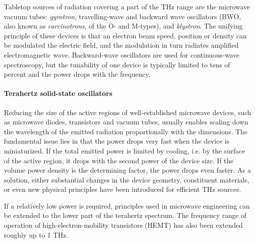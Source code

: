 Tabletop sources of radiation covering a part of the THz range are the microwave vacuum tubes: \textit{gyrotron}, travelling-wave and backward wave oscillators (BWO, also known as \textit{carcinotrons}, of the O- and M-types), and \textit{klystron}. The unifying principle of these devices is that an electron beam speed, position or density can be modulated the electric field, and the modulation in turn radiates amplified electromagnetic wave. Backward-wave oscillators are %
 used for continuous-wave spectroscopy, but the tunability of one device is typically limited to tens of percent and the power drops with the frequency.

\paragraph{Terahertz solid-state oscillators}%
Reducing the size of the active regions of well-established microwave devices, such as microwave diodes, transistors and vacuum tubes, usually enables scaling down the wavelength of the emitted radiation proportionally with the dimensions. 
The fundamental issue lies in that the power drops very fast when the device is miniaturized. If the total emitted power is limited by cooling, i.e. by the surface of the active region, it drops with the second power of the device size. If the volume power density is the determining factor, the power drops even faster.  %
As a solution, either substantial changes in the device geometry, constituent materials, or even new physical principles have been introduced for efficient THz sources.\cite[pp. 8-12]{sullivan2012field}  


If a relatively low power is required, principles used in microwave engineering can be extended to the lower part of the terahertz spectrum.  %
The frequency range of operation of high-electron-mobility transistors (HEMT) has also been extended roughly up to 1 THz. %

